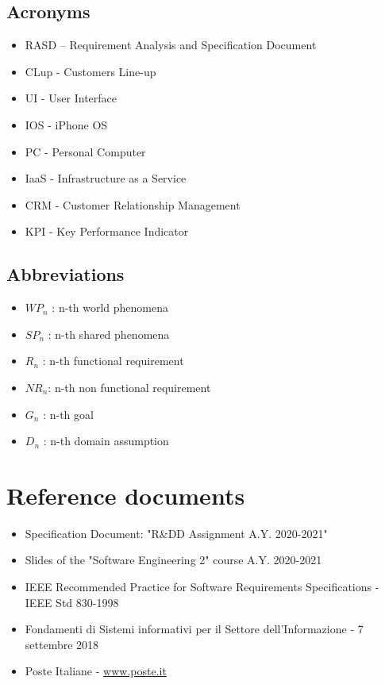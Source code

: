 \documentclass[a4paper,12pt]{report}
\begin{document}
\subsection{Acronyms}
\begin{itemize}
	\item RASD – Requirement Analysis and Specification Document
	\item CLup - Customers Line-up
	\item UI - User Interface
	\item IOS - iPhone OS
	\item PC - Personal Computer
	\item IaaS - Infrastructure as a Service
	\item CRM - Customer Relationship Management
	\item KPI - Key Performance Indicator
\end{itemize}

\subsection{Abbreviations}
\begin{itemize}
	\item  $WP_n$ : n-th world phenomena
	\item  $SP_n$ : n-th shared phenomena
	\item  $R_n$ : n-th functional requirement
	\item  $NR_n$: n-th non functional requirement
	\item  $G_n$ : n-th goal
	\item  $D_n$ : n-th domain assumption
\end{itemize}

\section{Reference documents} \label{Reference documents}
\begin{itemize}
	\item Specification Document: "R\&DD Assignment A.Y. 2020-2021"
	\item Slides of the "Software Engineering 2" course A.Y. 2020-2021
	\item IEEE Recommended Practice for Software Requirements Specifications - IEEE Std 830-1998
	\item  Fondamenti di Sistemi informativi per il Settore dell’Informazione - 7 settembre 2018
	\item Poste Italiane - \url{www.poste.it}
\end{itemize}
	
\end{document}
